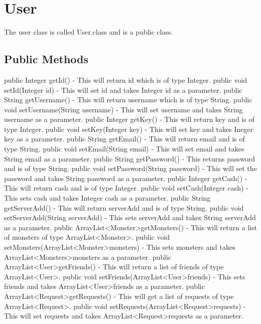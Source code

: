 \documentclass{project}
\begin{document}
\section{User}
The user class is called User.class and is a public class.
\subsection{Public Methods}
public Integer getId() - This will return id which is of type Integer. public void setId(Integer id) - This will set id and takes Integer id as a parameter.
public String getUsername() - This will return username which is of type String. public void setUsername(String username) - This will set username and takes String username as a parameter.
public Integer getKey() - This will return key and is of type Integer. public void setKey(Integer key) - This will set key and takes Ineger key as a parameter.
public String getEmail() - This will return email and is of type String. public void setEmail(String email) - This will set email and takes String email as a parameter.
public String getPassword() - This returns password and is of type String. public void setPassword(String password) - This will set the password and takes String password as a parameter.
public Integer getCash() - This will return cash and is of type Integer. public void setCash(Integer cash) - This sets cash and takes Integer cash as a parameter.
public String getServerAdd() - This will return serverAdd and is of type String. public void setServerAdd(String serverAdd) - This sets serverAdd and takes String serverAdd as a parameter.
public ArrayList\textless Monster\textgreater  getMonsters() - This will return a list of monsters of type ArrayList\textless Monster\textgreater. public void setMonsters(ArrayList\textless Monster\textgreater  monsters) - This sets monsters and takes ArrayList\textless Monsters\textgreater  monsters as a parameter.
public ArrayList\textless User\textgreater  getFriends() - This will return a list of friends of type ArrayList\textless User\textgreater. public void setFriends(ArrayList\textless User\textgreater  friends) - This sets friends and takes ArrayList\textless User\textgreater  friends as a parameter.
public ArrayList\textless Request\textgreater  getRequests() - This will get a list of requests of type ArrayList\textless Request\textgreater. public void setRequests(ArrayList\textless Request\textgreater  requests) - This will set requests and takes ArrayList\textless Request\textgreater  requests as a parameter.
\end{document}
